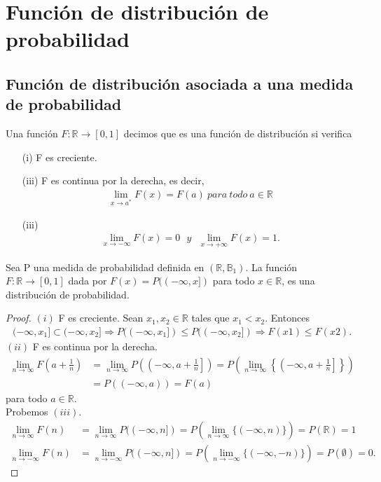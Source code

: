 \chapter{Función de distribución de probabilidad}

\section{Función de distribución asociada a una medida de probabilidad}

\begin{defi}
Una función $F: \mathbb{R} \longrightarrow [0,1]$ decimos que es una función de distribución si verifica
\begin{enumerate}
    \item[(i)] F es creciente.
    \item[(iii)] F es continua por la derecha, es decir,
    \begin{align*}
        \lim_{x \to a^*}{F(x)} = F(a) \ para \ todo \ a \in \mathbb{R}
    \end{align*}
    \item[(iii)]
    \begin{align*}
        \lim_{x \to -\infty}{F(x) = 0} \ \ \ y \ \ \ \lim_{x \to +\infty}{F(x) = 1}.
    \end{align*}
\end{enumerate}
\end{defi}

\begin{prop}
Sea P una medida de probabilidad definida en $(\mathbb{R}, \mathbb{B}_1)$. La función $F: \mathbb{R} \longrightarrow [0,1]$ dada por $F(x) = P((-\infty,x])$ para todo $x \in \mathbb{R}$, es una distribución de probabilidad.
\end{prop}

\begin{proof}
$(i)$ F es creciente. Sean $x_1, x_2 \in \mathbb{R}$ tales que $x_1 < x_2$. Entonces
\begin{align*}
    (-\infty, x_1] \subset (-\infty, x_2] \Longrightarrow P((-\infty, x_1]) \leq P((-\infty, x_2]) \Longrightarrow F(x1) \leq F(x2).
\end{align*}
$(ii)$ F es continua por la derecha.
\begin{align*}
    \lim_{n \to \infty}{F\left( a + \frac{1}{n}\right)} &= \lim_{n \to \infty}{P\left(\left( -\infty, a + \frac{1}{n}\right]\right)} = P\left( \lim_{n \to \infty}{\left\{ \left( -\infty, a + \frac{1}{n} \right]\right\}} \right)\\
    &= P((-\infty, a)) = F(a)
\end{align*}
para todo $a \in \mathbb{R}$.
\\
\newline
Probemos $(iii)$.
\begin{align*}
    \lim_{n \to \infty}{F(n)} &= \lim_{n \to \infty}{P((-\infty, n])} = P\left(\lim_{n \to \infty}{\{(-\infty, n) \}}\right) =P(\mathbb{R}) = 1\\
    \lim_{n \to -\infty}{F(n)} &= \lim_{n \to -\infty}{P((-\infty, n])} = P\left(\lim_{n \to -\infty}{\{(-\infty, -n) \}}\right) =P(\mathbb{\emptyset}) = 0.
\end{align*}
\end{proof}

